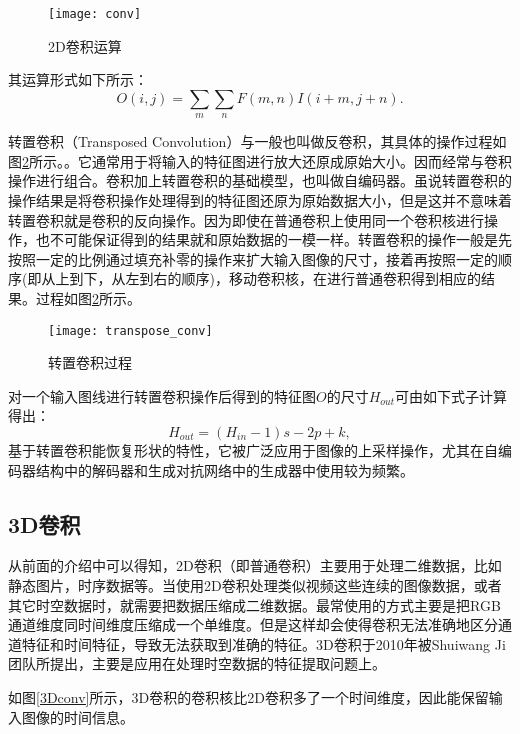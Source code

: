 \vspace{1em}
\begin{figure}[htbp] 
\centering
\texttt{[image: conv]}
\vspace{-0.5em}
\caption{2D卷积运算\label{conv2d}} 
\end{figure}

其运算形式如下所示：
\begin{equation}
	O(i, j) = \sum_{m} \sum_{n} F(m, n) I(i+m, j+n).
\end{equation}

转置卷积（Transposed Convolution）与一般也叫做反卷积，其具体的操作过程如图\ref{tranconv}所示。。它通常用于将输入的特征图进行放大还原成原始大小。因而经常与卷积操作进行组合。卷积加上转置卷积的基础模型，也叫做自编码器。虽说转置卷积的操作结果是将卷积操作处理得到的特征图还原为原始数据大小，但是这并不意味着转置卷积就是卷积的反向操作。因为即使在普通卷积上使用同一个卷积核进行操作，也不可能保证得到的结果就和原始数据的一模一样。转置卷积的操作一般是先按照一定的比例通过填充补零的操作来扩大输入图像的尺寸，接着再按照一定的顺序(即从上到下，从左到右的顺序)，移动卷积核，在进行普通卷积得到相应的结果。过程如图\ref{tranconv}所示。

\begin{figure}[htbp]
\centering
\texttt{[image: transpose\_conv]}
\vspace{0.25em}
\caption{转置卷积过程 \label{tranconv}}
\end{figure}

对一个输入图线进行转置卷积操作后得到的特征图$O$的尺寸$H_{out}$可由如下式子计算得出：
\begin{equation}
	H_{out}=(H_{in}-1)s - 2p+k,
\end{equation}
基于转置卷积能恢复形状的特性，它被广泛应用于图像的上采样操作，尤其在自编码器结构中的解码器和生成对抗网络中的生成器中使用较为频繁。

\subsection{3D卷积}
从前面的介绍中可以得知，2D卷积（即普通卷积）主要用于处理二维数据，比如静态图片，时序数据等。当使用2D卷积处理类似视频这些连续的图像数据，或者其它时空数据时，就需要把数据压缩成二维数据。最常使用的方式主要是把RGB通道维度同时间维度压缩成一个单维度。但是这样却会使得卷积无法准确地区分通道特征和时间特征，导致无法获取到准确的特征。3D卷积于2010年被Shuiwang Ji团队\cite{ji20123d}所提出，主要是应用在处理时空数据的特征提取问题上。

如图\ref{3Dconv}所示，3D卷积的卷积核比2D卷积多了一个时间维度，因此能保留输入图像的时间信息。

